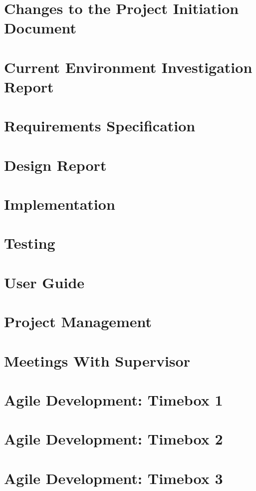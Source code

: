 \documentclass[journal, draftcls]{IEEEtran}
\begin{document}
\section{Changes to the Project Initiation Document}
\section{Current Environment Investigation Report}
\section{Requirements Specification}
\section{Design Report}
\section{Implementation}
\section{Testing}
\section{User Guide}
\section{Project Management}
\section{Meetings With Supervisor}
\section{Agile Development: Timebox 1}
\section{Agile Development: Timebox 2}
\section{Agile Development: Timebox 3}
\end{document}
